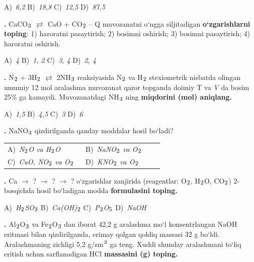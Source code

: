 \documentclass[11pt,a4paper]{article}
\renewcommand{\textsubscript}[1]{\ensuremath{_{\text{\fontsize{8}{8}\selectfont #1}}}}
\renewcommand{\textsuperscript}[1]{\ensuremath{^{\text{\fontsize{8}{8}\selectfont #1}}}}
\newcommand{\qn}[1]{\textbf{\fontsize{11.5}{13}\selectfont #1}}
\newcommand{\qsep}{\par\vspace{13pt}}
\begin{document}
\begin{multicols}{2}
\noindent A)~\textsl{6,2} \hfill B)~\textsl{18,8} \hfill C)~\textsl{12,5} \hfill D)~\textsl{87,5}\par
\qsep
\noindent\qn{12.} CaCO\textsubscript{3} $\rightleftarrows$ CaO + CO\textsubscript{2} -- Q muvozanatni o`ngga siljitadigan \textbf{o`zgarishlarni toping}: 1) haroratni pasaytirish; 2) bosimni oshirish; 3) bosimni pasaytirish; 4) haroratni oshirish.

\noindent A)~\textsl{4} \hfill B)~\textsl{1, 2} \hfill C)~\textsl{3, 4} \hfill D)~\textsl{2, 4}\par
\qsep
\noindent\qn{13.} N\textsubscript{2} + 3H\textsubscript{2} $\rightleftarrows$ 2NH\textsubscript{3} reaksiyasida N\textsubscript{2} va H\textsubscript{2} stexiometrik nisbatda olingan umumiy 12 mol aralashma muvozanat qaror topganda doimiy T va \textit{V} da bosim 25\% ga kamaydi. Muvozanatdagi NH\textsubscript{3} ning \textbf{miqdorini (mol) aniqlang.}

\noindent A)~\textsl{1,5} \hfill B)~\textsl{4,5} \hfill C)~\textsl{3} \hfill D)~\textsl{6}\par
\qsep
\noindent\qn{14.} NaNO\textsubscript{3} qizdirilganda qanday moddalar hosil bo`ladi?

\noindent\begin{tabular}{@{}p{0.47\linewidth}@{}p{0.47\linewidth}@{}}
A)~\textsl{N\textsubscript{2}O va H\textsubscript{2}O} & B)~\textsl{NaNO\textsubscript{2} va O\textsubscript{2}} \\
C)~\textsl{CuO, NO\textsubscript{2} va O\textsubscript{2}} & D)~\textsl{KNO\textsubscript{2} va O\textsubscript{2}} \\
\end{tabular}\par
\qsep
\noindent\qn{15.} Ca $\to$ ? $\to$ ? $\to$ ? o`zgarishlar zanjirida (reagentlar: O\textsubscript{2}, H\textsubscript{2}O, CO\textsubscript{2}) 2-bosqichda hosil bo`ladigan modda \textbf{formulasini toping.}

\noindent A)~\textsl{H\textsubscript{2}SO\textsubscript{3}} \hfill B)~\textsl{Ca(OH)\textsubscript{2}} \hfill C)~\textsl{P\textsubscript{2}O\textsubscript{5}} \hfill D)~\textsl{NaOH}\par
\qsep
\noindent\qn{16.} Al\textsubscript{2}O\textsubscript{3} va Fe\textsubscript{2}O\textsubscript{3} dan iborat 42,2 g aralashma mo`l konsentrlangan NaOH eritmasi bilan qizdirilganda, erimay qolgan qoldiq massasi 32 g bo`ldi. Aralashmaning zichligi 5,2 g/sm\textsuperscript{3} ga teng. Xuddi shunday aralashmani to`liq eritish uchun sarflanadigan HCl \textbf{massasini (g) toping.}


\end{multicols}
\end{document}
